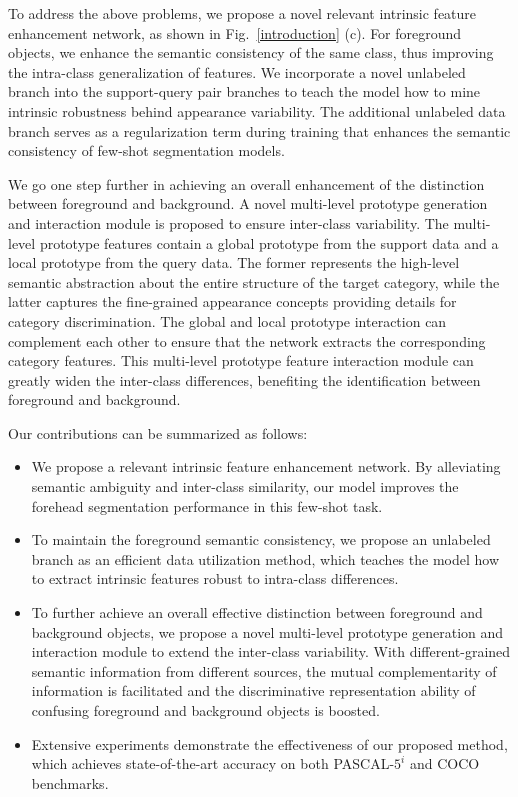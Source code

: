 \documentclass[letterpaper]{article} %
\begin{document}
To address the above problems, we propose a novel relevant intrinsic feature enhancement network, as shown in Fig.~\ref{introduction} (c). For foreground objects, we enhance the semantic consistency of the same class, thus improving the intra-class generalization of features. We incorporate a novel unlabeled branch into the support-query pair branches to teach the model how to mine intrinsic robustness behind appearance variability. The additional unlabeled data branch serves as a regularization term during training that enhances the semantic consistency of few-shot segmentation models.

We go one step further in achieving an overall enhancement of the distinction between foreground and background. A novel multi-level prototype generation and interaction module is proposed to ensure inter-class variability. The multi-level prototype features contain a global prototype from the support data and a local prototype from the query data. The former represents the high-level semantic abstraction about the entire structure of the target category, while the latter captures the fine-grained appearance concepts providing details for category discrimination. The global and local prototype interaction can complement each other to ensure that the network extracts the corresponding category features. This multi-level prototype feature interaction module can greatly widen the inter-class differences, benefiting the identification between foreground and background.

Our contributions can be summarized as follows:
\begin{itemize}
\item We propose a relevant intrinsic feature enhancement network. By alleviating semantic ambiguity and inter-class similarity, our model improves the forehead segmentation performance in this few-shot task.
\item To maintain the foreground semantic consistency, we propose an unlabeled branch as an efficient data utilization method, which teaches the model how to extract intrinsic features robust to intra-class differences.
\item To further achieve an overall effective distinction between foreground and background objects, we propose a novel multi-level prototype generation and interaction module to extend the inter-class variability. With different-grained semantic information from different sources, the mutual complementarity of information is facilitated and the discriminative representation ability of confusing foreground and background objects is boosted.
\item Extensive experiments demonstrate the effectiveness of our proposed method, which achieves state-of-the-art accuracy on both PASCAL-$5^i$ and COCO benchmarks.
\end{itemize}
\end{document}
